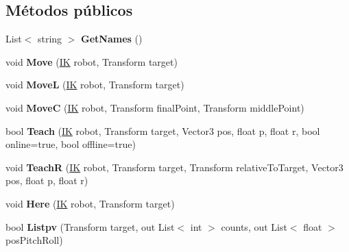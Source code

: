 \subsection*{Métodos públicos}
\begin{DoxyCompactItemize}
\item 
\mbox{\label{class_command_control_abb616afbdc86f4877b19b951982b6544}} 
List$<$ string $>$ {\bfseries Get\+Names} ()
\item 
\mbox{\label{class_command_control_a57aac28ce1f8ad74a4c2b69a24db8d79}} 
void {\bfseries Move} (\mbox{\hyperlink{class_i_k}{IK}} robot, Transform target)
\item 
\mbox{\label{class_command_control_ab0c2d7d4d5b0ec2329f3bf945af1cbc0}} 
void {\bfseries MoveL} (\mbox{\hyperlink{class_i_k}{IK}} robot, Transform target)
\item 
\mbox{\label{class_command_control_a55788d3a11dcdb25426d84e3b7c75450}} 
void {\bfseries MoveC} (\mbox{\hyperlink{class_i_k}{IK}} robot, Transform final\+Point, Transform middle\+Point)
\item 
\mbox{\label{class_command_control_afa86230800735c59b15295e22301dafc}} 
bool {\bfseries Teach} (\mbox{\hyperlink{class_i_k}{IK}} robot, Transform target, Vector3 pos, float p, float r, bool online=true, bool offline=true)
\item 
\mbox{\label{class_command_control_a7d9c79f2e4d83fba39878b254d0c9616}} 
void {\bfseries TeachR} (\mbox{\hyperlink{class_i_k}{IK}} robot, Transform target, Transform relative\+To\+Target, Vector3 pos, float p, float r)
\item 
\mbox{\label{class_command_control_a9915c709ac0920b97e9ef9fb01d7cb8b}} 
void {\bfseries Here} (\mbox{\hyperlink{class_i_k}{IK}} robot, Transform target)
\item 
\mbox{\label{class_command_control_a150fcea4451c4cb929c0b0e2385c2698}} 
bool {\bfseries Listpv} (Transform target, out List$<$ int $>$ counts, out List$<$ float $>$ pos\+Pitch\+Roll)
\item 

\end{DoxyCompactItemize}
